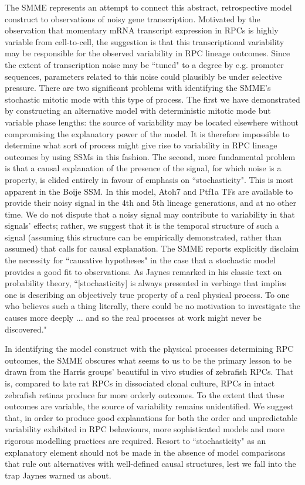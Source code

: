 The SMME represents an attempt to connect this abstract, retrospective model construct to observations of noisy gene transcription\cite{Raj2008}. Motivated by the observation that momentary mRNA transcript expression in RPCs is highly variable from cell-to-cell\cite{Trimarchi2008}, the suggestion is that this transcriptional variability may be responsible for the observed variability in RPC lineage outcomes. Since the extent of transcription noise may be ``tuned" to a degree by e.g. promoter sequences\cite{Raser2004}, parameters related to this noise could plausibly be under selective pressure. There are two significant problems with identifying the SMME's stochastic mitotic mode with this type of process. The first we have demonstrated by constructing an alternative model with deterministic mitotic mode but variable phase lengths: the source of variability may be located elsewhere without compromising the explanatory power of the model. It is therefore impossible to determine what sort of process might give rise to variability in RPC lineage outcomes by using SSMs in this fashion. The second, more fundamental problem is that a causal explanation of the presence of the signal, for which noise is a property, is elided entirely in favour of emphasis on ``stochasticity". This is most apparent in the Boije SSM. In this model, Atoh7 and Ptf1a TFs are available to provide their noisy signal in the 4th and 5th lineage generations, and at no other time. We do not dispute that a noisy signal may contribute to variability in that signals' effects; rather, we suggest that it is the temporal structure of such a signal (assuming this structure can be empirically demonstrated, rather than assumed) that calls for causal explanation. The SMME reports explicitly disclaim the necessity for ``causative hypotheses" in the case that a stochastic model provides a good fit to observations. As Jaynes remarked in his classic text on probability theory, ``[stochasticity] is always presented in verbiage that implies one is describing an objectively true property of a real physical process. To one who believes such a thing literally, there could be no motivation to investigate the causes more deeply ... and so the real processes at work might never be discovered."\cite{Jaynes2003} 

In identifying the model construct with the physical processes determining RPC outcomes, the SMME obscures what seems to us to be the primary lesson to be drawn from the Harris groups' beautiful in vivo studies of zebrafish RPCs. That is, compared to late rat RPCs in dissociated clonal culture, RPCs in intact zebrafish retinas produce far more orderly outcomes. To the extent that these outcomes are variable, the source of variability remains unidentified. We suggest that, in order to produce good explanations for both the order and unpredictable variability exhibited in RPC behaviours, more sophisticated models and more rigorous modelling practices are required. Resort to ``stochasticity" as an explanatory element should not be made in the absence of model comparisons that rule out alternatives with well-defined causal structures, lest we fall into the trap Jaynes warned us about.